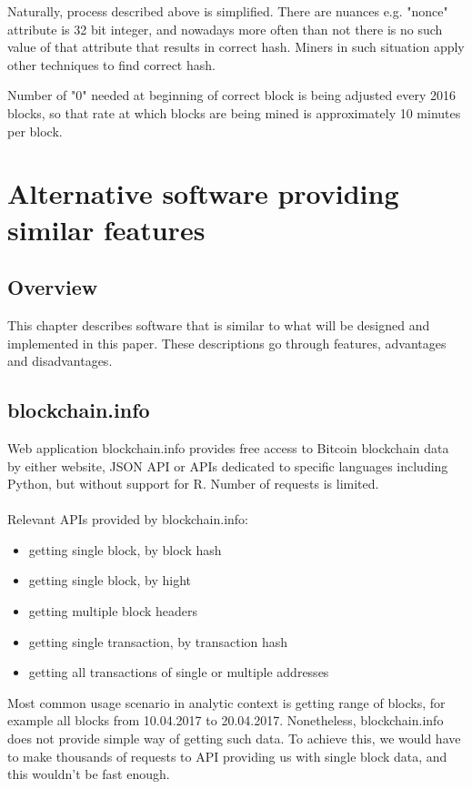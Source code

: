 \documentclass[12pt, en, eng, oneside]{mgr}
\begin{document}
Naturally, process described above is simplified. There are nuances e.g. "nonce" attribute is 32 bit integer, and nowadays more often than not there is no such value of that attribute that results in correct hash. Miners in such situation apply other techniques to find correct hash.

Number of "0" needed at beginning of correct block is being adjusted every 2016 blocks, so that rate at which blocks are being mined is approximately 10 minutes per block.  


      



\chapter{Alternative software providing similar features}

\section{Overview}
This chapter describes software that is similar to what will be designed and implemented in this paper. These descriptions go through features, advantages and disadvantages. 

\section{blockchain.info}

Web application blockchain.info provides free access to Bitcoin blockchain data by either website, JSON API or APIs dedicated to specific languages including Python, but without support for R. Number of requests is limited.
\\
\\
Relevant APIs provided by blockchain.info:
\begin{itemize}
\item
getting single block, by block hash
\item
getting single block, by hight
\item
getting multiple block headers
\item
getting single transaction, by transaction hash
\item
getting all transactions of single or multiple addresses


\end{itemize}

Most common usage scenario in analytic context is getting range of blocks, for example all blocks from 10.04.2017 to 20.04.2017. Nonetheless, blockchain.info does not provide simple way of getting such data. To achieve this, we would have to make thousands of requests to API providing us with single block data, and this wouldn't be fast enough.
\end{document}
